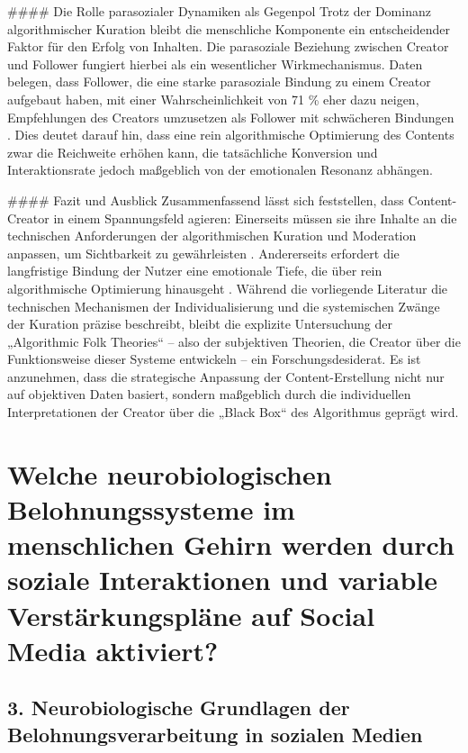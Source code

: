 \documentclass[11pt,a4paper]{article}
\begin{document}
\#\#\#\# Die Rolle parasozialer Dynamiken als Gegenpol Trotz der Dominanz algorithmischer Kuration bleibt die menschliche Komponente ein entscheidender Faktor für den Erfolg von Inhalten. Die parasoziale Beziehung zwischen Creator und Follower fungiert hierbei als ein wesentlicher Wirkmechanismus. Daten belegen, dass Follower, die eine starke parasoziale Bindung zu einem Creator aufgebaut haben, mit einer Wahrscheinlichkeit von 71 \% eher dazu neigen, Empfehlungen des Creators umzusetzen als Follower mit schwächeren Bindungen \autocite{grey_grey_5d5c282590c448fc8776b04f78a08de5}. Dies deutet darauf hin, dass eine rein algorithmische Optimierung des Contents zwar die Reichweite erhöhen kann, die tatsächliche Konversion und Interaktionsrate jedoch maßgeblich von der emotionalen Resonanz abhängen.

\#\#\#\# Fazit und Ausblick Zusammenfassend lässt sich feststellen, dass Content-Creator in einem Spannungsfeld agieren: Einerseits müssen sie ihre Inhalte an die technischen Anforderungen der algorithmischen Kuration und Moderation anpassen, um Sichtbarkeit zu gewährleisten \autocite{crossref_10_31219_osf_io_y4kwm}. Andererseits erfordert die langfristige Bindung der Nutzer eine emotionale Tiefe, die über rein algorithmische Optimierung hinausgeht \autocite{grey_grey_5d5c282590c448fc8776b04f78a08de5}. Während die vorliegende Literatur die technischen Mechanismen der Individualisierung und die systemischen Zwänge der Kuration präzise beschreibt, bleibt die explizite Untersuchung der „Algorithmic Folk Theories“ – also der subjektiven Theorien, die Creator über die Funktionsweise dieser Systeme entwickeln – ein Forschungsdesiderat. Es ist anzunehmen, dass die strategische Anpassung der Content-Erstellung nicht nur auf objektiven Daten basiert, sondern maßgeblich durch die individuellen Interpretationen der Creator über die „Black Box“ des Algorithmus geprägt wird.

\section{Welche neurobiologischen Belohnungssysteme im menschlichen Gehirn werden durch soziale Interaktionen und variable Verstärkungspläne auf Social Media aktiviert?}

\subsection{3. Neurobiologische Grundlagen der Belohnungsverarbeitung in sozialen Medien}
\end{document}
